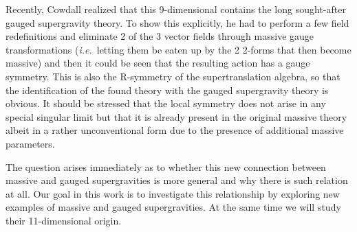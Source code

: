 \documentclass[12pt,a4paper]{article}
\begin{document}
Recently, Cowdall \cite{kn:cow} realized that this 9-dimensional
contains the long sought-after \coordHE{}  \coordHE{} gauged supergravity theory.
To show this explicitly, he had to perform a few field redefinitions
and eliminate 2 of the 3 vector fields through massive gauge
transformations ({\em i.e.}~letting them be eaten up by the 2 2-forms
that then become massive) and then it could be seen that the resulting
action has a \coordHE{} gauge symmetry.  This \coordHE{} is also the
R-symmetry of the \coordHE{}  \coordHE{} supertranslation algebra, so that the
identification of the found theory with the gauged supergravity theory
is obvious.  It should be stressed that the local \coordHE{} symmetry
does not arise in any special singular limit but that it is already
present in the original massive theory albeit in a rather
unconventional form due to the presence of additional massive
parameters.

The question arises immediately as to whether this new connection
between massive and gauged supergravities is more general and why
there is such relation at all. Our goal in this work is to investigate
this relationship by exploring new examples of massive and gauged
supergravities. At the same time we will study their 11-dimensional
origin.
\end{document}
